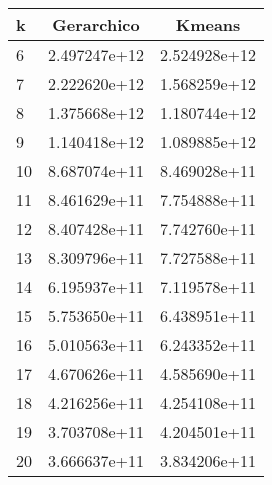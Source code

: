 \begin{tabular}{lcc}
	\toprule
	k  & Gerarchico   & Kmeans       \\
	\midrule
	6  & 2.497247e+12 & 2.524928e+12 \\
	7  & 2.222620e+12 & 1.568259e+12 \\
	8  & 1.375668e+12 & 1.180744e+12 \\
	9  & 1.140418e+12 & 1.089885e+12 \\
	10 & 8.687074e+11 & 8.469028e+11 \\
	11 & 8.461629e+11 & 7.754888e+11 \\
	12 & 8.407428e+11 & 7.742760e+11 \\
	13 & 8.309796e+11 & 7.727588e+11 \\
	14 & 6.195937e+11 & 7.119578e+11 \\
	15 & 5.753650e+11 & 6.438951e+11 \\
	16 & 5.010563e+11 & 6.243352e+11 \\
	17 & 4.670626e+11 & 4.585690e+11 \\
	18 & 4.216256e+11 & 4.254108e+11 \\
	19 & 3.703708e+11 & 4.204501e+11 \\
	20 & 3.666637e+11 & 3.834206e+11 \\
	\bottomrule
\end{tabular}
